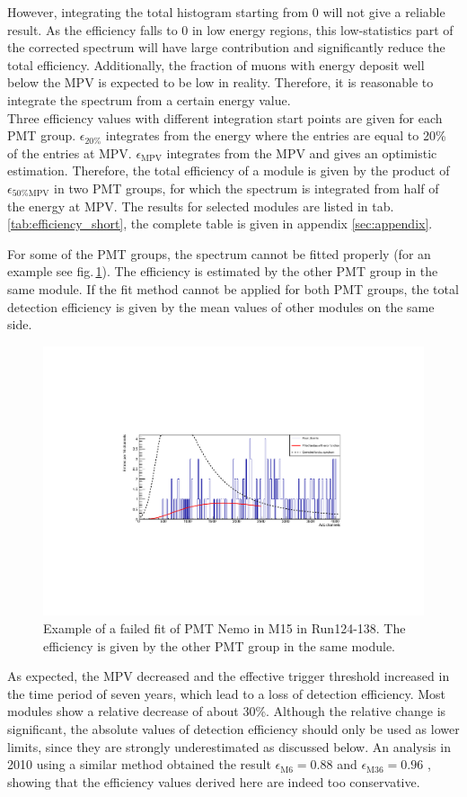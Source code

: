 However, integrating the total histogram starting from 0 will not give a reliable result. As the efficiency falls to 0 in low energy regions, this low-statistics part of the corrected spectrum will have large contribution and significantly reduce the total efficiency. Additionally, the fraction of muons with energy deposit well below the MPV is expected to be low in reality. Therefore, it is reasonable to integrate the spectrum from a certain energy value.\\
Three efficiency values with different integration start points are given for each PMT group. $\epsilon_{20\%}$ integrates from the energy where the entries are equal to 20\% of the entries at MPV. $\epsilon_{\mathrm{MPV}}$ integrates from the MPV and gives an optimistic estimation. Therefore, the total efficiency of a module is given by the product of $\epsilon_{50\%\mathrm{MPV}}$ in two PMT groups, for which the spectrum is integrated from half of the energy at MPV. The results for selected modules are listed in tab.\,\ref{tab:efficiency_short}, the complete table is given in appendix \ref{sec:appendix}.

For some of the PMT groups, the spectrum cannot be fitted properly (for an example see fig.\,\ref{fig:fail_M15}). The efficiency is estimated by the other PMT group in the same module. If the fit method cannot be applied for both PMT groups, the total detection efficiency is given by the mean values of other modules on the same side.


\begin{figure}[ht!]
  \centering
  \includegraphics[width=0.7\textwidth{}]{./fig/M15fail.pdf}
  \caption{Example of a failed fit of PMT Nemo in M15 in Run124-138. The efficiency is given by the other PMT group in the same module.}
  \label{fig:fail_M15}
\end{figure}

As expected, the MPV decreased and the effective trigger threshold increased in the time period of seven years, which lead to a loss of detection efficiency. Most modules show a relative decrease of about 30\%. Although the relative change is significant, the absolute values of detection efficiency should only be used as lower limits, since they are strongly underestimated as discussed below. An analysis in 2010 using a similar method obtained the result $\epsilon_{\mathrm{M6}}=0.88$ and $\epsilon_{\mathrm{M36}}=0.96$ \cite{Nie10}, showing that the efficiency values derived here are indeed too conservative.


